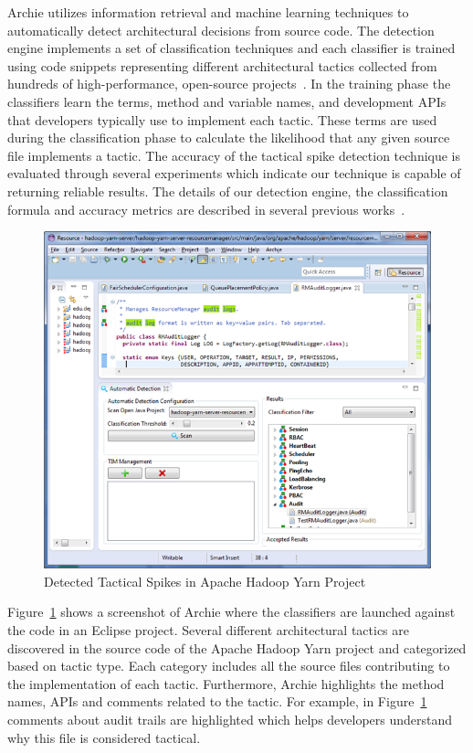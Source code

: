 Archie utilizes information retrieval and machine learning techniques to automatically detect architectural decisions from source code. The detection engine implements a set of classification techniques and each classifier is trained using code snippets representing different architectural tactics collected from hundreds of high-performance, open-source projects~\cite{FSE2012,ICSE2012,Dissertation}. In the training phase the classifiers learn the terms, method and variable names, and development APIs that developers typically use to implement each tactic. These terms are used during the classification phase to calculate the likelihood that any given source file implements a tactic. The accuracy of the tactical spike detection technique is evaluated through several experiments which indicate our technique is capable of returning reliable results. The details of our detection engine, the classification formula and accuracy metrics are described in several previous works~\cite{Dissertation,ICSE2012}. 

\begin{figure}[tbph]
\centering
\includegraphics[width=0.9\linewidth]{./Detect}
\caption{Detected Tactical Spikes in Apache Hadoop Yarn Project}
\label{fig:Detect}
\end{figure}

Figure~\ref{fig:Detect} shows a screenshot of Archie where the classifiers are launched against the code in an Eclipse project. Several different architectural tactics are discovered in the source code of the Apache Hadoop Yarn project and categorized based on tactic type. Each category includes all the source files contributing to the implementation of each tactic. Furthermore, Archie highlights the method names, APIs and comments related to the tactic. For example, in Figure~\ref{fig:Detect} comments about audit trails are highlighted which helps developers understand why this file is considered tactical.

